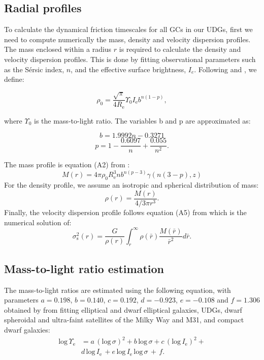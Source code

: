 \documentclass[baaa]{baaa}
\begin{document}
\subsection{Radial profiles}\label{subsec:radial}
To calculate the dynamical friction timescales for all GCs in our UDGs,  first we need to compute numerically the mass, density and velocity dispersion profiles.
The mass enclosed within a radius $r$ is required to calculate the density and velocity dispersion profiles. This is done by fitting observational parameters such as the Sérsic index, $n$, and the effective surface brightness, $I_e$. 
Following \cite{Leigh_Fragione} and \cite{Terzic_Graham}, we define:

\begin{equation}
    \rho_0 = \frac{\sqrt{\pi}}{4R_{\textrm{e}}}\Upsilon_0 I_{\textrm{e}} b^{n(1-p)},
\end{equation}

\noindent where $\Upsilon_0$ is the mass-to-light ratio. The variables b and p are approximated as:

\begin{equation}
    b = 1.9992n-0.3271 
\end{equation}
\begin{equation}
    p = 1 - \frac{0.6097}{n} + \frac{0.055}{n^2}.
\end{equation}

\noindent The mass profile is equation (A2) from \cite{Terzic_Graham}:
\begin{equation}
    M(r) =  4 \pi \rho_0 R_{\textrm{e}}^3 n b^{n(p-3)} \gamma(n(3-p),z)
\end{equation}
For the density profile, we assume an isotropic and spherical distribution of mass:
\begin{equation}
    \rho(r) = \frac{M(r)}{4/3 \pi r^3}.
\end{equation}
Finally, the velocity dispersion profile follows equation (A5) from \cite{Terzic_Graham} which is the numerical solution of:
\begin{equation}
    \sigma^2_{\mathrm{s}}(r) = \frac{G}{\rho(r)} \int_r^{\infty} \rho(\bar r) \frac{M(\bar r)}{\bar r^{2}} d\bar r.
\end{equation}

\subsection{Mass-to-light ratio estimation}\label{subsec:ml}
The mass-to-light ratios are estimated using the following equation, with parameters $a=0.198$, $b=0.140$, $c=0.192$, $d=-0.923$, $e=-0.108$ and $f=1.306$ obtained by \cite{Zaritsky2022_mass_estimation} from fitting elliptical and dwarf elliptical galaxies, UDGs, dwarf spheroidal and ultra-faint satellites of the Milky Way and M31, and compact dwarf galaxies: %
\begin{align}
        \text{log} \, \Upsilon_{\textrm{e}} &= a\, (\text{log} \, \sigma)^2 + b\, \text{log} \,\sigma + c \,(\text{log} \,I_{\textrm{e}})^2 + \nonumber
        \\ & d \, \text{log} \,I_{\textrm{e}} \,+ e\, \text{log} \,I_{\textrm{e}} \,\text{log} \,\sigma \,+ \,f.
\end{align}
\end{document}

